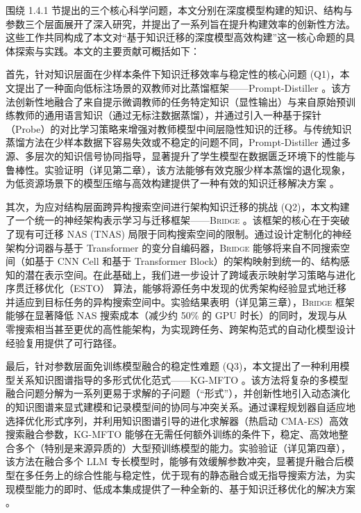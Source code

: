 \documentclass[../main.tex]{subfiles}
\begin{document}

围绕 1.4.1 节提出的三个核心科学问题，本文分别在深度模型构建的知识、结构与参数三个层面展开了深入研究，并提出了一系列旨在提升构建效率的创新性方法。这些工作共同构成了本文对“基于知识迁移的深度模型高效构建”这一核心命题的具体探索与实践。本文的主要贡献可概括如下：

首先，针对知识层面在少样本条件下知识迁移效率与稳定性的核心问题 (Q1)，本文提出了一种面向低标注场景的双教师对比蒸馏框架——Prompt-Distiller 。该方法创新性地融合了来自提示微调教师的任务特定知识（显性输出）与来自原始预训练教师的通用语言知识（通过无标注数据蒸馏），并通过引入一种基于探针（Probe）的对比学习策略来增强对教师模型中间层隐性知识的迁移。与传统知识蒸馏方法在少样本数据下容易失效或不稳定的问题不同，Prompt-Distiller 通过多源、多层次的知识信号协同指导，显著提升了学生模型在数据匮乏环境下的性能与鲁棒性。实验证明（详见第二章），该方法能够有效克服少样本蒸馏的退化现象，为低资源场景下的模型压缩与高效构建提供了一种有效的知识迁移解决方案 。

其次，为应对结构层面跨异构搜索空间进行架构知识迁移的挑战 (Q2)，本文构建了一个统一的神经架构表示学习与迁移框架——\textsc{Bridge} 。该框架的核心在于突破了现有可迁移 NAS (TNAS) 局限于同构搜索空间的限制。通过设计定制化的神经架构分词器与基于 Transformer 的变分自编码器，\textsc{Bridge} 能够将来自不同搜索空间（如基于 CNN Cell 和基于 Transformer Block）的架构映射到统一的、结构感知的潜在表示空间。在此基础上，我们进一步设计了跨域表示映射学习策略与进化序贯迁移优化（ESTO） 算法，能够将源任务中发现的优秀架构经验显式地迁移并适应到目标任务的异构搜索空间中。实验结果表明（详见第三章），\textsc{Bridge} 框架能够在显著降低 NAS 搜索成本（减少约 50\% 的 GPU 时长）的同时，发现与从零搜索相当甚至更优的高性能架构，为实现跨任务、跨架构范式的自动化模型设计经验复用提供了可行路径。

最后，针对参数层面免训练模型融合的稳定性难题 (Q3)，本文提出了一种利用模型关系知识图谱指导的多形式优化范式——KG-MFTO 。该方法将复杂的多模型融合问题分解为一系列更易于求解的子问题（“形式”），并创新性地引入动态演化的知识图谱来显式建模和记录模型间的协同与冲突关系。通过课程规划器自适应地选择优化形式序列，并利用知识图谱引导的进化求解器（热启动 CMA-ES）高效搜索融合参数，KG-MFTO 能够在无需任何额外训练的条件下，稳定、高效地整合多个（特别是来源异质的）大型预训练模型的能力。实验验证（详见第四章），该方法在融合多个 LLM 专长模型时，能够有效缓解参数冲突，显著提升融合后模型在多任务上的综合性能与稳定性，优于现有的静态融合或无指导搜索方法，为实现模型能力的即时、低成本集成提供了一种全新的、基于知识迁移优化的解决方案 。
\end{document}
